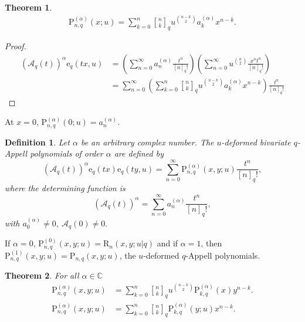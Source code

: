 \documentclass[12pt]{article}
\newcommand{\qbinom}{\genfrac{[}{]}{0pt}{}}
\newcommand{\C}{\mathbb{C}}
\newcommand{\e}{\mathrm{e}}
\newcommand{\A}{\mathcal{A}}
\newcommand{\p}{\mathrm{P}}
\newcommand{\rr}{\mathrm{R}}
\newtheorem{theorem}{Theorem}
\newtheorem{definition}{Definition}
\begin{document}
\begin{theorem}\label{theo_iden1}
    \begin{align}
        \p_{n,q}^{(\alpha)}(x;u)=\sum_{k=0}^{n}\qbinom{n}{k}_{q}u^{\binom{n-k}{2}}a_{k}^{(\alpha)}x^{n-k}.
    \end{align}
\end{theorem}
\begin{proof}
    \begin{align*}
        (\A_{q}(t))^{\alpha}\e_{q}(tx,u)&=\left(\sum_{n=0}^{\infty}a_{n}^{(\alpha)}\frac{t^n}{[n]_{q}!}\right)\left(\sum_{n=0}^{\infty}u^{\binom{n}{2}}\frac{x^nt^n}{[n]_{q}!}\right)\\
        &=\sum_{n=0}^{\infty}\left(\sum_{k=0}^{n}\qbinom{n}{k}_{q}u^{\binom{n-k}{2}}a_{k}^{(\alpha)}x^{n-k}\right)\frac{t^{n}}{[n]_{q}!}
    \end{align*}
\end{proof}
At $x=0$, $\p_{n,q}^{(\alpha)}(0;u)=a_{n}^{(\alpha)}$.
\begin{definition}
Let $\alpha$ be an arbitrary complex number. The $u$-deformed bivariate $q$-Appell polynomials of order $\alpha$ are defined by
\begin{equation}\label{eqn_uqApp2}
    (\A_{q}(t))^{\alpha}\e_{q}(tx)\e_{q}(ty,u)=\sum_{n=0}^{\infty}\p_{n,q}^{(\alpha)}(x,y;u)\frac{t^{n}}{[n]_{q}!},
\end{equation}
where the determining function is 
\begin{equation}
    (\A_{q}(t))^{\alpha}=\sum_{n=0}^{\infty}a_{n}^{(\alpha)}\frac{t^n}{[n]_{q}!},
\end{equation}
with $a_{0}^{(\alpha)}\neq0,\ \A_{q}(0)\neq0.$
\end{definition}
If $\alpha=0$, $\p_{n,q}^{(0)}(x,y;u)=\rr_{n}(x,y;u|q)$ and if $\alpha=1$, then $\p_{n,q}^{(1)}(x,y;u)=\p_{n,q}(x,y;u)$, the $u$-deformed $q$-Appell polynomials. 
\begin{theorem}\label{theo_iden2}
For all $\alpha\in\C$
    \begin{align}
        \p_{n,q}^{(\alpha)}(x,y;u)&=\sum_{k=0}^{n}\qbinom{n}{k}_{q}u^{\binom{n-k}{2}}\p_{k,q}^{(\alpha)}(x)y^{n-k}.\label{eqn_iden21}\\
        \p_{n,q}^{(\alpha)}(x,y;u)&=\sum_{k=0}^{n}\qbinom{n}{k}_{q}\p_{k,q}^{(\alpha)}(y;u)x^{n-k}.\label{eqn_iden22}
    \end{align}
\end{theorem}
\end{document}
